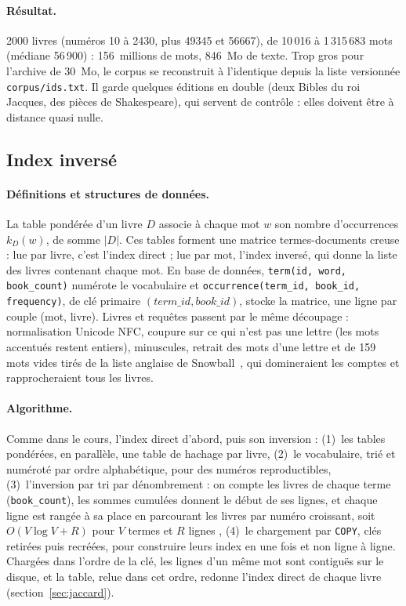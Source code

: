 \paragraph{Résultat.} 2000 livres (numéros 10 à 2430, plus 49345 et 56667), de
10\,016 à 1\,315\,683 mots (médiane 56\,900) : 156~millions de mots, 846~Mo de
texte. Trop gros pour l'archive de 30~Mo, le corpus se reconstruit à
l'identique depuis la liste versionnée \texttt{corpus/ids.txt}. Il garde
quelques éditions en double (deux Bibles du roi Jacques, des pièces de
Shakespeare), qui servent de contrôle : elles doivent être à distance quasi
nulle.

\subsection{Index inversé}
\label{sec:index}

\paragraph{Définitions et structures de données.} La table pondérée d'un livre
$D$ associe à chaque mot $w$ son nombre d'occurrences $k_D(w)$, de somme
$|D|$. Ces tables forment une matrice termes-documents creuse : lue par livre,
c'est l'index direct ; lue par mot, l'index inversé, qui donne la liste des
livres contenant chaque mot. En base de données,
\texttt{term(id, word, book\_count)} numérote le vocabulaire et
\texttt{occurrence(term\_id, book\_id, frequency)}, de clé primaire
$(\mathit{term\_id}, \mathit{book\_id})$, stocke la matrice, une ligne par
couple (mot, livre). Livres et requêtes passent par le même découpage :
normalisation Unicode NFC, coupure sur ce qui n'est pas une lettre (les mots
accentués restent entiers), minuscules, retrait des mots d'une lettre et de 159
mots vides tirés de la liste anglaise de Snowball~\cite{snowball}, qui
domineraient les comptes et rapprocheraient tous les livres.

\paragraph{Algorithme.} Comme dans le cours, l'index direct
d'abord, puis son inversion : (1)~les tables pondérées, en parallèle, une table
de hachage par livre, (2)~le vocabulaire, trié et numéroté par ordre
alphabétique, pour des numéros reproductibles, (3)~l'inversion par tri par
dénombrement : on compte les livres de chaque terme (\texttt{book\_count}), les
sommes cumulées donnent le début de ses lignes, et chaque ligne est rangée à sa
place en parcourant les livres par numéro croissant, soit $O(V \log V + R)$ pour
$V$ termes et $R$ lignes , (4)~le chargement par \texttt{COPY}, clés retirées
puis recréées, pour construire leurs index en une fois et non ligne à ligne.
Chargées dans l'ordre de la clé, les lignes d'un même mot sont contiguës sur le
disque, et la table, relue dans cet ordre, redonne l'index direct de chaque
livre (section~\ref{sec:jaccard}).


